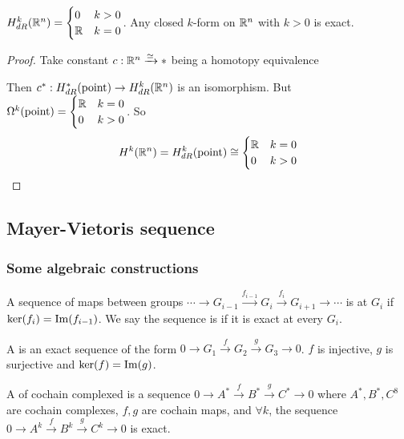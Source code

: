 
\begin{corollary}\label{Poincare Lemma}
    $ H^k_{dR}(\mathbb R^n)=\displaystyle\begin{cases}
       0 &k>0\\
       \mathbb R &k=0
    \end{cases} $. \ie Any closed  $ k $-form on  $ \mathbb R^n $ with  $ k>0 $  is exact. 
\end{corollary}
\begin{proof}
   Take constant  $ c:\mathbb R^n\xrightarrow{\simeq} *$ being a homotopy equivalence

   Then  $ c^*:H^*_{dR}(\text{point})\rightarrow H_{dR}^k(\mathbb R^n) $ is an isomorphism. But  $ \Omega^k(\text{point})=\begin{cases}
       \mathbb R &k=0\\
       0 &k>0
   \end{cases}  $. So
   \begin{equation*}
       H^k(\mathbb R^n)=H^k_{dR}(\text{point})\cong\begin{cases}
           \mathbb R&k=0\\
           0&k>0
       \end{cases}
   \end{equation*} 
\end{proof}
\subsection{Mayer-Vietoris sequence}
\subsubsection{Some algebraic constructions}
A sequence of maps between groups  $ \cdots\rightarrow G_{i-1}\xrightarrow{f_{i-1}} G_i\xrightarrow{f_i} G_{i+1}\rightarrow\cdots $ is  at  $ G_i $  if  $ \ker(f_i)=\mathrm{Im}(f_{i-1}) $. 
We say the sequence is  if it is exact at every  $ G_i$.

A  is an exact sequence of the form  $ 0\rightarrow G_1\xrightarrow{f} G_2\xrightarrow{g} G_3\rightarrow 0 $. \ie  $ f  $ is injective,  $ g  $ is surjective and  $ \ker(f)=\mathrm{Im}(g) $.

A  of cochain complexed is a sequence  $ 0\rightarrow A^*\xrightarrow{f}B^*\xrightarrow{g}C^*\rightarrow 0 $ where  $ A^*,B^*,C^8 $ are cochain complexes,  $ f,g $ are cochain maps, and  $ \forall k $, the sequence  $ 0\rightarrow A^k\xrightarrow{f}B^k\xrightarrow{g}C^k\rightarrow 0 $     is exact.


